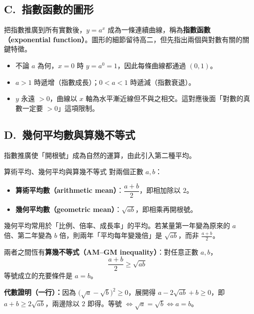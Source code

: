 \documentclass[11pt]{article}
\begin{document}
\subsection*{\sffamily C.\ 指數函數的圖形}

把指數推廣到所有實數後，$y=a^x$ 成為一條連續曲線，稱為\textbf{指數函數（exponential function）}。圖形的細節留待高二，但先指出兩個與對數有關的關鍵特徵。


\begin{itemize}\setlength{\itemsep}{1pt}
\item 不論 $a$ 為何，$x=0$ 時 $y=a^0=1$，因此每條曲線都通過 $(0,1)$。
\item $a>1$ 時遞增（指數成長）；$0<a<1$ 時遞減（指數衰退）。
\item $y$ 永遠 $>0$，曲線以 $x$ 軸為水平漸近線但不與之相交。這對應後面「對數的真數一定要 $>0$」這項限制。
\end{itemize}

\subsection*{\sffamily D.\ 幾何平均數與算幾不等式}

指數推廣使「開根號」成為自然的運算，由此引入第二種平均。

\begin{補充框}{算術平均、幾何平均與算幾不等式}
對兩個正數 $a,b$：
\begin{itemize}\setlength{\itemsep}{1pt}
\item \textbf{算術平均數（arithmetic mean）}：$\dfrac{a+b}{2}$，即相加除以 $2$。
\item \textbf{幾何平均數（geometric mean）}：$\sqrt{ab}$，即相乘再開根號。
\end{itemize}
幾何平均常用於「比例、倍率、成長率」的平均。若某量第一年變為原來的 $a$ 倍、第二年變為 $b$ 倍，則兩年「平均每年變幾倍」是 $\sqrt{ab}$，而非 $\frac{a+b}{2}$。

兩者之間恆有\textbf{算幾不等式（AM–GM inequality）}：對任意正數 $a,b$，
$$\boxed{\;\frac{a+b}{2}\ge\sqrt{ab}\;}$$
等號成立的充要條件是 $a=b$。

\textbf{代數證明（一行）：}因為 $\big(\sqrt a-\sqrt b\big)^2\ge0$，展開得 $a-2\sqrt{ab}+b\ge0$，即 $a+b\ge2\sqrt{ab}$，兩邊除以 $2$ 即得。等號 $\Leftrightarrow\sqrt a=\sqrt b\Leftrightarrow a=b$。
\end{補充框}
\end{document}
